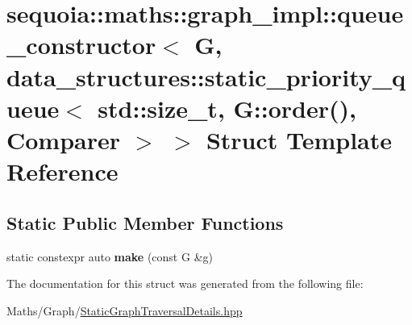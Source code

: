 \hypertarget{structsequoia_1_1maths_1_1graph__impl_1_1queue__constructor_3_01_g_00_01data__structures_1_1statf3c43f293a0918266bf7d69990bb612a}{}\section{sequoia\+::maths\+::graph\+\_\+impl\+::queue\+\_\+constructor$<$ G, data\+\_\+structures\+::static\+\_\+priority\+\_\+queue$<$ std\+::size\+\_\+t, G\+::order(), Comparer $>$ $>$ Struct Template Reference}
\label{structsequoia_1_1maths_1_1graph__impl_1_1queue__constructor_3_01_g_00_01data__structures_1_1statf3c43f293a0918266bf7d69990bb612a}
\subsection*{Static Public Member Functions}
\begin{DoxyCompactItemize}
\item 
\mbox{\label{structsequoia_1_1maths_1_1graph__impl_1_1queue__constructor_3_01_g_00_01data__structures_1_1statf3c43f293a0918266bf7d69990bb612a_abcd821fabdb5261e33564f0e44d775c8}} 
static constexpr auto {\bfseries make} (const G \&g)
\end{DoxyCompactItemize}


The documentation for this struct was generated from the following file\+:\begin{DoxyCompactItemize}
\item 
Maths/\+Graph/\mbox{\hyperlink{_static_graph_traversal_details_8hpp}{Static\+Graph\+Traversal\+Details.\+hpp}}\end{DoxyCompactItemize}
